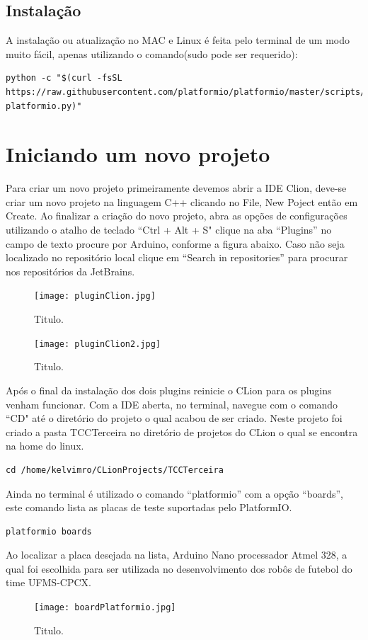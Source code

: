 \documentclass[a4paper,12pt,portuguese]{ufms-cpcx}
\begin{document}
\subsection{Instalação}
A instalação ou atualização no MAC e Linux é feita pelo terminal de um modo muito fácil, apenas utilizando o comando(sudo pode ser requerido): 
\begin{lstlisting}
python -c "$(curl -fsSL https://raw.githubusercontent.com/platformio/platformio/master/scripts/get-platformio.py)"
\end{lstlisting}

\section{Iniciando um novo projeto}
Para criar um novo projeto primeiramente devemos abrir a IDE Clion, deve-se criar um novo projeto na linguagem C++ clicando no File, New Poject então em Create. Ao finalizar a criação do novo projeto, abra as opções de configurações utilizando o atalho de teclado ``Ctrl + Alt + S" clique na aba ``Plugins” no campo de texto procure por Arduino, conforme a figura abaixo. Caso não seja localizado no repositório local clique em ``Search in repositories” para procurar nos repositórios da JetBrains.
\begin{figure}[H]	
	\centering
	\texttt{[image: pluginClion.jpg]}
	\caption{Titulo.}
\end{figure}
\begin{figure}[H]	
	\centering
	\texttt{[image: pluginClion2.jpg]}
	\caption{Titulo.}
\end{figure}
Após o final da instalação dos dois plugins reinicie o CLion para os plugins venham funcionar. Com a IDE aberta, no terminal, navegue com o comando ``CD" até o diretório do projeto o qual acabou de ser criado. Neste projeto foi criado a pasta TCCTerceira no diretório de projetos do CLion o qual se encontra na home do linux.
\begin{lstlisting}
cd /home/kelvimro/CLionProjects/TCCTerceira
\end{lstlisting}
Ainda no terminal é utilizado o comando ``platformio” com a opção ``boards”, este comando lista as placas de teste suportadas pelo PlatformIO.
\begin{lstlisting}
platformio boards
\end{lstlisting}
Ao localizar a placa desejada na lista, Arduino Nano processador Atmel 328, a qual foi escolhida para ser utilizada no desenvolvimento dos robôs de futebol do time UFMS-CPCX.
\begin{figure}[H]	
	\centering
	\texttt{[image: boardPlatformio.jpg]}
	\caption{Titulo.}
\end{figure}
\end{document}
